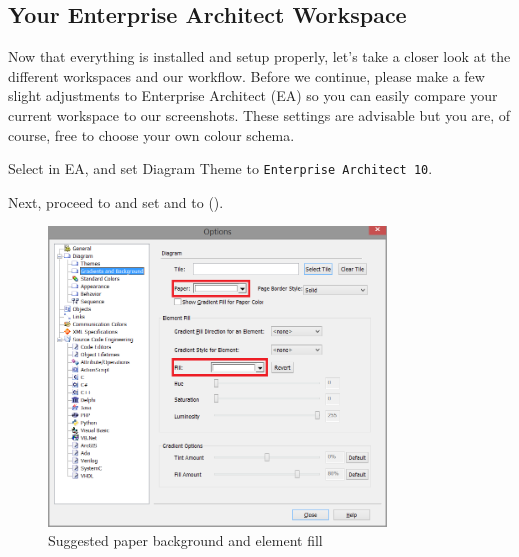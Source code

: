 \genHeader

\subsection{Your Enterprise Architect Workspace}

Now\hypertarget{projectStructure vis}{} that everything is installed and setup properly, let's take a closer look at the different workspaces and our workflow.
Before we continue, please make a few slight adjustments to Enterprise Architect (EA) so you can easily compare your current workspace to our screenshots.
These settings are advisable but you are, of course, free to choose your own colour schema.

\begin{stepbystep}

\item  Select  in EA, and set Diagram Theme to \texttt{Enterprise Architect 10}.

\item  Next, proceed to  and set  and  to  (). 

\begin{figure}[htbp]
    \centering
    \includegraphics[width=0.8\textwidth]{../../org.moflon.doc.handbook.01_installation/4_projectSetup/modelingWithEA/ea_images/standardPaperAndFill}
    \caption{Suggested paper background and element fill}
    \label{ea:paperAndElementFill}
\end{figure}


\end{stepbystep}
